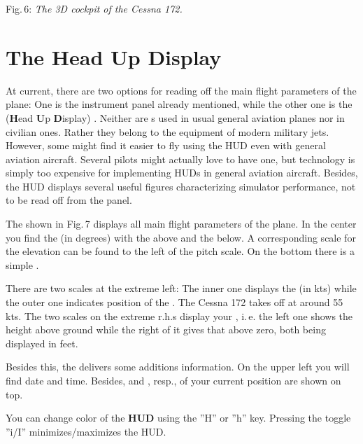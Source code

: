 \smallskip
 \noindent
Fig.\,6: \textit{The 3D cockpit of the Cessna 172.}
\medskip


\section{The Head Up Display}

At current, there are two options for reading off the main flight parameters of the
plane: One is the instrument panel already mentioned, while the other one is the
 (\textbf{H}ead \textbf{U}p \textbf{D}isplay) . Neither
are s used in usual general aviation planes nor in civilian ones. Rather they
belong to the equipment of modern military jets. However, some might find it easier to
fly using the HUD even with general aviation aircraft. Several  pilots
might actually love to have one, but technology is simply too expensive for implementing
HUDs in general aviation aircraft. Besides, the HUD displays several useful figures
characterizing simulator performance, not to be read off from the panel.

The  shown in Fig.\,7  displays all main flight parameters of the plane. In
the center you find the  (in degrees) with the  above and the  below. A corresponding scale for the
elevation can be found to the left of the pitch scale. On the
bottom there is a simple .

There are two scales at the extreme left: The inner one displays the  (in
kts) while the outer one indicates position of the . The Cessna 172 takes
off at around 55 kts. The two scales on the extreme r.h.s display your ,
i.\,e. the left one shows the height above ground while the right of it gives that above
zero, both being displayed in feet.

Besides this, the  delivers some additions information. On the upper left you
will find date and time. Besides,   and , resp., of your current position are shown on top.

You can change color of the \textbf{HUD} using the ''H'' or ''h''  key. Pressing the toggle ''i/I'' minimizes/maximizes the HUD.

